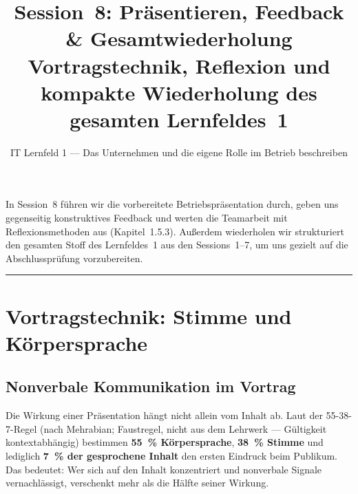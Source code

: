 \documentclass[11pt, a4paper]{article}
\title{\vspace*{-1.5cm}\Huge\bfseries\color{bfwPrimaryDark}Session~8: Präsentieren, Feedback \& Gesamtwiederholung\\[0.4em]
  \large\color{bfwInkSoft}\textnormal{Vortragstechnik, Reflexion und kompakte Wiederholung des gesamten Lernfeldes~1}}
\author{\textsf{IT Lernfeld 1 --- Das Unternehmen und die eigene Rolle im Betrieb beschreiben}}
\date{}
\begin{document}
\maketitle
\thispagestyle{empty}

\vspace{1em}
\begin{merksatz}[title={\bfseries Worum geht es in dieser Session?}]
In Session~8 führen wir die vorbereitete Betriebspräsentation durch, geben uns gegenseitig
konstruktives Feedback und werten die Teamarbeit mit Reflexionsmethoden aus (Kapitel~1.5.3).
Außerdem wiederholen wir strukturiert den gesamten Stoff des Lernfeldes~1 aus den Sessions~1--7,
um uns gezielt auf die Abschlussprüfung vorzubereiten.
\end{merksatz}

\tableofcontents
\vspace{1em}
\hrule
\vspace{1em}

\section{Vortragstechnik: Stimme und Körpersprache}

\subsection{Nonverbale Kommunikation im Vortrag}

Die Wirkung einer Präsentation hängt nicht allein vom Inhalt ab.
Laut der 55-38-7-Regel (nach Mehrabian; Faustregel, nicht aus dem Lehrwerk --- Gültigkeit kontextabhängig)
bestimmen \textbf{55~\% Körpersprache}, \textbf{38~\% Stimme}
und lediglich \textbf{7~\% der gesprochene Inhalt} den ersten Eindruck beim Publikum.
Das bedeutet: Wer sich auf den Inhalt konzentriert und nonverbale Signale vernachlässigt,
verschenkt mehr als die Hälfte seiner Wirkung.
\end{document}

